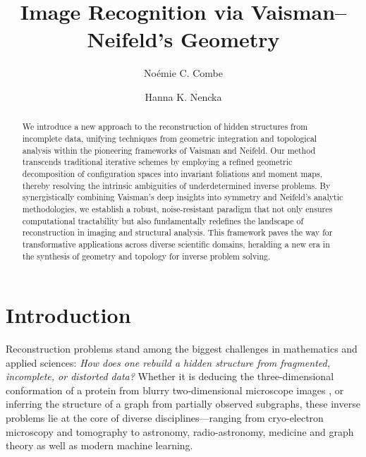 \documentclass[runningheads]{llncs}
\begin{document}
%
\title{Image Recognition via Vaisman--Neifeld's Geometry}
%
%
\author{No\'emie C. Combe \and
Hanna K. Nencka }
%
%

%
\maketitle              %
%
\begin{abstract}
We introduce a new approach to the reconstruction of hidden structures from incomplete data, unifying techniques from geometric integration and topological analysis within the pioneering frameworks of Vaisman and Neifeld. Our method transcends traditional iterative schemes by employing a refined geometric decomposition of configuration spaces into invariant foliations and moment maps, thereby resolving the intrinsic ambiguities of underdetermined inverse problems. By synergistically combining Vaisman’s deep insights into symmetry and Neifeld’s analytic methodologies, we establish a robust, noise-resistant paradigm that not only ensures computational tractability but also fundamentally redefines the landscape of reconstruction in imaging and structural analysis. This framework paves the way for transformative applications across diverse scientific domains, heralding a new era in the synthesis of geometry and topology for inverse problem solving.
\end{abstract}

\section{Introduction}
Reconstruction problems stand among the biggest challenges in mathematics and applied sciences: \emph{How does one rebuild a hidden structure from fragmented, incomplete, or distorted data?} Whether it is deducing the three-dimensional conformation of a protein from blurry two-dimensional microscope images \cite{CSSS}, or inferring the structure of a graph from partially observed subgraphs, these inverse problems lie at the core of diverse disciplines—ranging from cryo-electron microscopy and  tomography to astronomy, radio-astronomy, medicine and graph theory as well as modern machine learning.
\end{document}
